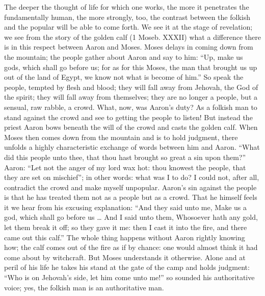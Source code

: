 \documentclass[12pt]{book}
\newcommand{\opage}[1]{\marginnote{\footnotesize\textit{[#1]}}}
\begin{document}
The deeper the thought of life for which one works, the more it
penetrates the fundamentally human, the more strongly, too, the contrast
between the folkish and the popular will be able to come forth. We see
it at the stage of revelation; we see from the story of the golden calf
(1 Moseb. XXXII) what a difference there is in this respect between
Aaron and Moses. Moses delays in coming down from the mountain; the
people gather about Aaron and say to him: ``Up, make us gods, which shall
go before us; for as for this Moses, the man that brought us up out of
the land of Egypt, we know not what is become of him.'' So speak the
people, tempted by flesh and blood; they will fall away from Jehovah,
the God of the spirit; they will fall away from themselves; they are no
longer a people, but a sensual, raw rabble, a crowd. What, now, was
Aaron's duty? As a folkish man to stand against the crowd and see to
getting the people to listen! But instead the priest Aaron bows beneath
the will of the crowd and casts the golden calf. When Moses then comes
down from the mountain and is to hold judgment, there unfolds a highly
characteristic exchange of words between him and Aaron. ``What did this
people unto thee, that thou hast brought so great a sin upon them?''
Aaron: ``Let not
\opage{133}\setcounter{footnote}{0}%
the anger of my lord wax hot: thou knowest the people, that they are
set on mischief''; in other words: what was I to do? I could not, after
all, contradict the crowd and make myself unpopular. Aaron's sin against
the people is that he has treated them not as a people but as a crowd.
That he himself feels it we hear from his excusing explanation: ``And
they said unto me, Make us a god, which shall go before us \ldots{} And I
said unto them, Whosoever hath any gold, let them break it off; so they
gave it me: then I cast it into the fire, and there came out this
calf.'' The whole thing happens without Aaron rightly knowing how; the
calf comes out of the fire as if by chance: one would almost think it
had come about by witchcraft. But Moses understands it otherwise. Alone
and at peril of his life he takes his stand at the gate of the camp and
holds judgment: ``Who is on Jehovah's side, let him come unto me!'' so
sounded his authoritative voice; yes, the folkish man is an
authoritative man.
\end{document}
